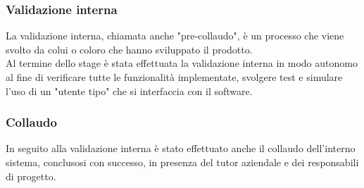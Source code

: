 \subsubsection{Validazione interna}
La validazione interna, chiamata anche "pre-collaudo", è un processo che viene svolto da colui o coloro che hanno sviluppato il prodotto.\\
Al termine dello stage è stata effettuata la validazione interna in modo autonomo al fine di verificare tutte le funzionalità implementate, svolgere test e simulare l'uso di un "utente tipo" che si interfaccia con il software.
\subsubsection{Collaudo}
In seguito alla validazione interna è stato effettuato anche il collaudo dell'interno sistema, conclusosi con successo, in presenza del tutor aziendale e dei responsabili di progetto.

